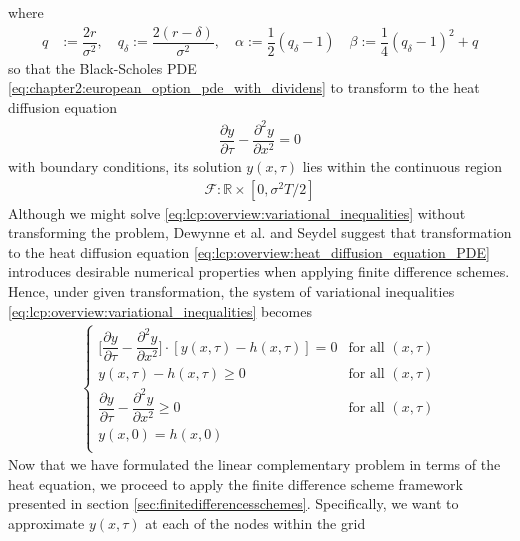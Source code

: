 where
\begin{align}
  \label{eq:lcp:overview:heat_diffusion_domain_transformation_2}
  q &:= \dfrac{2r}{\sigma^2}, \quad q_{\delta} := \dfrac{2(r-\delta)}{\sigma^2}, \quad \alpha := \dfrac{1}{2}(q_{\delta} - 1) \quad \beta := \dfrac{1}{4}(q_{\delta} - 1)^2 + q 
\end{align}
so that the Black-Scholes PDE \eqref{eq:chapter2:european_option_pde_with_dividens} to transform to the heat diffusion equation
\begin{align}
  \label{eq:lcp:overview:heat_diffusion_equation_PDE}
  \dfrac{\partial{y}}{\partial{\tau}} - \dfrac{\partial^2{y}}{\partial{x^2}} = 0
\end{align}
with boundary conditions, its solution $y(x,\tau)$ lies within the continuous region 
\begin{align}
  \label{eq:lcp:overview:heat_diffusion_equation_solution_region}
  \mathcal{F}: \mathbb{R} \times [0, \sigma^2T/2]
\end{align}
Although we might solve \eqref{eq:lcp:overview:variational_inequalities} without transforming the problem, Dewynne et al. \cite{dewynne_howison_rupf_wilmott_1993} and Seydel \cite{seydel_2009} suggest that transformation to the heat diffusion equation \eqref{eq:lcp:overview:heat_diffusion_equation_PDE} introduces desirable numerical properties when applying finite difference schemes. Hence, under given transformation, the system of variational inequalities \eqref{eq:lcp:overview:variational_inequalities} becomes
\begin{align}
  \begin{cases}
    \bigg[\dfrac{\partial{y}}{\partial{\tau}} - \dfrac{\partial^2{y}}{\partial{x^2}}\bigg] \cdot [y(x, \tau) - h(x, \tau)] = 0 & \text{for all $(x,\tau)$} \\
    y(x, \tau) - h(x, \tau) \ge 0 & \text{for all $(x, \tau)$}\\
    \dfrac{\partial{y}}{\partial{\tau}} - \dfrac{\partial^2{y}}{\partial{x^2}} \ge 0 &  \text{for all $(x, \tau)$}\\
    y(x, 0) = h(x, 0) \\  
  \end{cases}
  \label{eq:lcp:overview:variational_inequalities_heat_equation}
\end{align}
Now that we have formulated the linear complementary problem in terms of the heat equation, we proceed to apply the finite difference scheme framework presented in section \ref{sec:finitedifferencesschemes}. Specifically, we want to approximate $y(x, \tau)$ at each of the nodes within the grid 
